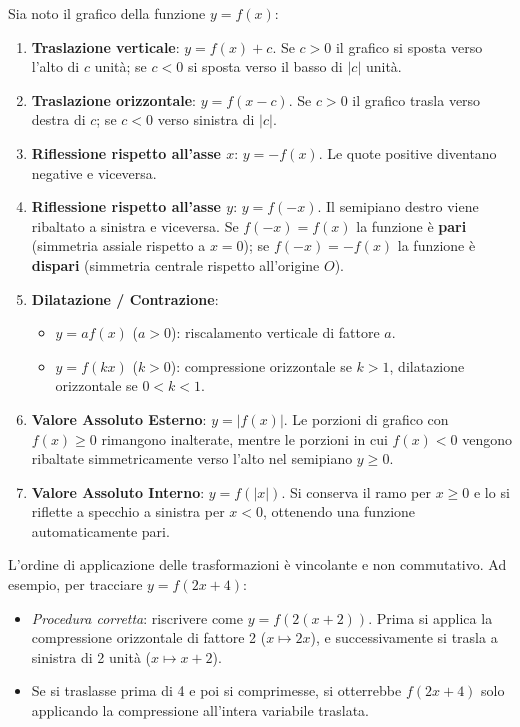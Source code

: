 \begin{metodo}
Sia noto il grafico della funzione $y = f(x)$:
\begin{enumerate}
    \item \textbf{Traslazione verticale}: $y = f(x) + c$. Se $c > 0$ il grafico si sposta verso l'alto di $c$ unità; se $c < 0$ si sposta verso il basso di $|c|$ unità.
    \item \textbf{Traslazione orizzontale}: $y = f(x - c)$. Se $c > 0$ il grafico trasla verso destra di $c$; se $c < 0$ verso sinistra di $|c|$.
    \item \textbf{Riflessione rispetto all'asse $x$}: $y = -f(x)$. Le quote positive diventano negative e viceversa.
    \item \textbf{Riflessione rispetto all'asse $y$}: $y = f(-x)$. Il semipiano destro viene ribaltato a sinistra e viceversa. Se $f(-x) = f(x)$ la funzione è \textbf{pari} (simmetria assiale rispetto a $x = 0$); se $f(-x) = -f(x)$ la funzione è \textbf{dispari} (simmetria centrale rispetto all'origine $O$).
    \item \textbf{Dilatazione / Contrazione}:
    \begin{itemize}
        \item $y = a f(x)$ ($a > 0$): riscalamento verticale di fattore $a$.
        \item $y = f(k x)$ ($k > 0$): compressione orizzontale se $k > 1$, dilatazione orizzontale se $0 < k < 1$.
    \end{itemize}
    \item \textbf{Valore Assoluto Esterno}: $y = |f(x)|$. Le porzioni di grafico con $f(x) \ge 0$ rimangono inalterate, mentre le porzioni in cui $f(x) < 0$ vengono ribaltate simmetricamente verso l'alto nel semipiano $y \ge 0$.
    \item \textbf{Valore Assoluto Interno}: $y = f(|x|)$. Si conserva il ramo per $x \ge 0$ e lo si riflette a specchio a sinistra per $x < 0$, ottenendo una funzione automaticamente pari.
\end{enumerate}
\end{metodo}

\begin{esame}
L'ordine di applicazione delle trasformazioni è vincolante e non commutativo.
Ad esempio, per tracciare $y = f(2x + 4)$:
\begin{itemize}
    \item \emph{Procedura corretta}: riscrivere come $y = f(2(x + 2))$. Prima si applica la compressione orizzontale di fattore 2 ($x \mapsto 2x$), e successivamente si trasla a sinistra di 2 unità ($x \mapsto x + 2$).
    \item Se si traslasse prima di 4 e poi si comprimesse, si otterrebbe $f(2x + 4)$ solo applicando la compressione all'intera variabile traslata.
\end{itemize}
\end{esame}

